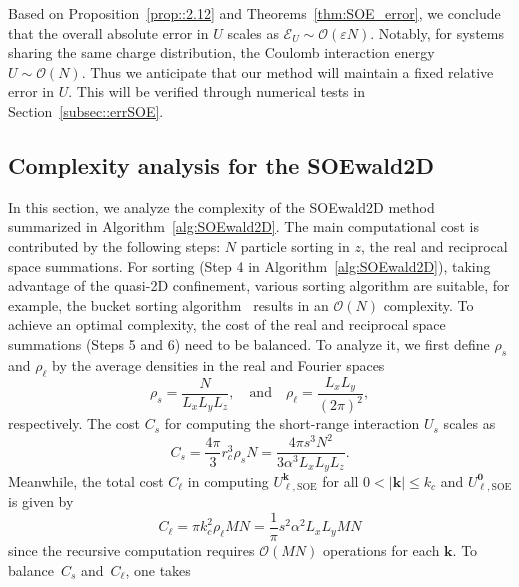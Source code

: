 Based on Proposition~\ref{prop::2.12} and Theorems~\ref{thm:SOE_error}, we conclude that the overall absolute error in $U$ scales as $\mathscr{E}_{U}\sim \mathcal{O}(\varepsilon N)$. 
Notably, for systems sharing the same charge distribution, the Coulomb interaction energy $U \sim \mathcal{O}(N)$. 
Thus we anticipate that our method will maintain a fixed relative error in $U$. 
This will be verified through numerical tests in Section~\ref{subsec::errSOE}.

\subsection{Complexity analysis for the SOEwald2D}
In this section, we analyze the complexity of the SOEwald2D method summarized in Algorithm~\ref{alg:SOEwald2D}. 
The main computational cost is contributed by the following steps: $N$ particle sorting in $z$, the real and reciprocal space summations.
For sorting (Step 4 in Algorithm~\ref{alg:SOEwald2D}), taking advantage of the quasi-2D confinement, various sorting algorithm are suitable, for example, the bucket sorting algorithm~\cite{cormen2022introduction} results in an $\mathcal{O}(N)$ complexity.
To achieve an optimal complexity, the cost of the real and reciprocal space summations (Steps 5 and 6) need to be balanced. 
To analyze it, we first define $\rho_{s}$ and $\rho_{\ell}$ by the average densities in the real and Fourier spaces 
\begin{equation}
	\rho_{s}=\frac{N}{L_x L_y L_z},\quad \text{and} \quad \rho_{\ell}=\frac{L_xL_y}{(2\pi)^2},
\end{equation}
respectively.
The cost $C_s$ for computing the short-range interaction $U_{s}$ scales as
\begin{equation}\label{eq::cs}
	C_{s}=\frac{4\pi}{3}r_c^3\rho_{s}N=\frac{4\pi s^3N^2}{3\alpha^3 L_xL_yL_z}.
\end{equation}
Meanwhile, the total cost $ C_{\ell}$ in computing $U_{\ell,\text{SOE}}^{\bm{k}}$ for all $0<|\bm{k}|\leq k_c$ and $U_{\ell,\text{SOE}}^{\bm{0}}$ is given by
\begin{equation}\label{eq::cll}
	C_{\ell} = \pi k_c^2\rho_{\ell}MN = \frac{1}{\pi}s^2 \alpha^2 L_x L_y M N
\end{equation}
since the recursive computation requires $\mathcal{O}(MN)$ operations for each $\bm{k}$. 
To balance~$C_{s}$ and~$C_{\ell}$, one takes
